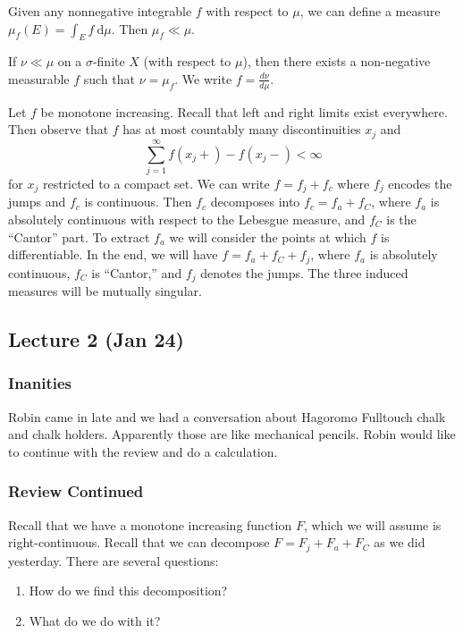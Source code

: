 \documentclass[10pt, twoside]{article}
\renewcommand{\d}{\ \mathrm{d}}
\begin{document}
    \begin{exm}
        Given any nonnegative integrable $f$ with respect to $\mu$, we can define a measure $\mu_f(E) = \int_E f \d \mu$. Then $\mu_f \ll \mu$.
    \end{exm}

    \begin{thm}
        If $\nu \ll \mu$ on a $\sigma$-finite $X$ (with respect to $\mu$), then there exists a non-negative measurable $f$ such that $\nu = \mu_f$. We write $f = \frac{d\nu}{d\mu}$.
    \end{thm}

    \begin{exm}
        Let $f$ be monotone increasing. Recall that left and right limits exist everywhere. Then observe that $f$ has at most countably many discontinuities $x_j$ and \[ \sum_{j=1}^{\infty} f(x_j+) - f(x_j-) < \infty \] for $x_j$ restricted to a compact set. We can write $f = f_j + f_c$ where $f_j$ encodes the jumps and $f_c$ is continuous. Then $f_c$ decomposes into $f_c = f_a + f_C$, where $f_a$ is absolutely continuous with respect to the Lebesgue measure, and $f_C$ is the ``Cantor'' part. To extract $f_a$ we will consider the points at which $f$ is differentiable. In the end, we will have $f = f_a + f_C + f_j$, where $f_a$ is absolutely continuous, $f_C$ is ``Cantor,'' and $f_j$ denotes the jumps. The three induced measures will be mutually singular.
    \end{exm}

    \subsection{Lecture 2 (Jan 24)}%
    \subsubsection{Inanities}%
    Robin came in late and we had a conversation about Hagoromo Fulltouch chalk and chalk holders. Apparently those are like mechanical pencils. Robin would like to continue with the review and do a calculation.

   \subsubsection{Review Continued}%
   Recall that we have a monotone increasing function $F$, which we will assume is right-continuous. Recall that we can decompose $F = F_j + F_a + F_C$ as we did yesterday.
   There are several questions: 
   \begin{enumerate}
       \item How do we find this decomposition?
       \item What do we do with it?
   \end{enumerate}
\end{document}
